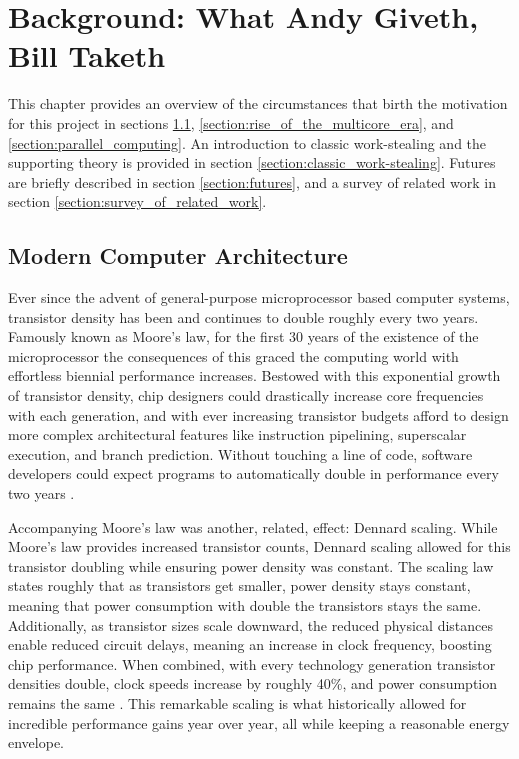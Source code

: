 \documentclass[bsc,frontabs,singlespacing,parskip,deptreport,normalheadings]{infthesis}
\begin{document}

\chapter{Background: What Andy Giveth, Bill Taketh}
\label{chapter:background:_what_andy_giveth,_bill_taketh}

This chapter provides an overview of the circumstances that birth the motivation
for this project in sections \ref{section:modern_computer_architecture},
\ref{section:rise_of_the_multicore_era}, and \ref{section:parallel_computing}.
An introduction to classic work-stealing and the supporting theory is provided
in section \ref{section:classic_work-stealing}. Futures are briefly described in
section \ref{section:futures}, and a survey of related work in section
\ref{section:survey_of_related_work}.

\section{Modern Computer Architecture}
\label{section:modern_computer_architecture}

Ever since the advent of general-purpose microprocessor based computer systems,
transistor density has been and continues to double roughly every two years.
Famously known as Moore's law, for the first 30 years of the existence of the
microprocessor the consequences of this graced the computing world with
effortless biennial performance increases. Bestowed with this exponential growth
of transistor density, chip designers could drastically increase core
frequencies with each generation, and with ever increasing transistor budgets
afford to design more complex architectural features like instruction
pipelining, superscalar execution, and branch prediction. Without touching a
line of code, software developers could expect programs to automatically double
in performance every two years \cite{hennessy_new_2019}.

Accompanying Moore's law was another, related, effect: Dennard scaling. While
Moore's law provides increased transistor counts, Dennard scaling allowed for
this transistor doubling while ensuring power density was constant. The scaling
law states roughly that as transistors get smaller, power density stays
constant, meaning that power consumption with double the transistors stays the
same. Additionally, as transistor sizes scale downward, the reduced physical
distances enable reduced circuit delays, meaning an increase in clock frequency,
boosting chip performance. When combined, with every technology generation
transistor densities double, clock speeds increase by roughly 40\%, and power
consumption remains the same \cite{borkar_future_2011}. This remarkable scaling
is what historically allowed for incredible performance gains year over year,
all while keeping a reasonable energy envelope.
\end{document}
